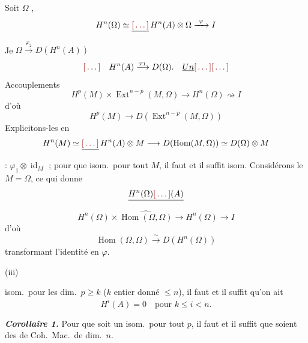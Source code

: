 \documentclass[11pt,a4paper]{article}
\begin{document}
Soit  $\Omega$ , 
\[
  H^n(\Omega) \simeq \struck{\ill{}}\, H^n(A) \otimes \Omega
  \xrightarrow{\ \varphi\ } I
\]
\struck{\ill{} \ill{}} Je  \ill{} \ill{} \ill{} \ill{}
$\Omega \xrightarrow{\varphi_2} D(H^n(A))$
\[
  \ill{}\quad H^n(A) \xrightarrow{\varphi_1} D(\Omega).
  \quad \uncertain{Un} \ill{} \ill{}
\]
Accouplements
\[
  H^p(M) \times \operatorname{Ext}^{n-p}(M, \Omega) \longrightarrow
  H^n(\Omega) \rightsquigarrow I
\]
d'où
\[
  H^p(M) \longrightarrow D(\operatorname{Ext}^{n-p}(M, \Omega))
\]
Explicitons-les en  
\[
  H^n(M) \simeq \struck{\ill{}}\, H^n(A) \otimes M \longrightarrow
  D(\operatorname{Hom}(M, \Omega)) \simeq D(\Omega) \otimes M
\]
\struck{\ill{} \ill{}}  : $\varphi_1 \otimes
\operatorname{id}_M$ ; pour que \ill{}
isom.\ pour tout $M$, il faut
et il suffit \ill{}  \ill{}
isom. Considérons le  $M = \Omega$,
ce qui donne
\[
  \struck{H^n(\Omega) \ill{}(A)}
\]
\[
  H^n(\Omega) \times \widehat{\operatorname{Hom}(\Omega, \Omega)}
  \longrightarrow H^n(\Omega) \longrightarrow I
\]
d'où
\[
  \operatorname{Hom}(\Omega, \Omega) \xrightarrow{\ \sim\ } D(H^n(\Omega))
\]
transformant l'identité en $\varphi$. 
 \struck{\ill{} \ill{} \ill{} \ill{} \ill{} :}


 \quad (iii)

isom.\ pour les dim.\ $p \geqslant k$
($k$ entier donné $\leqslant n$), il faut et il
suffit qu'on ait
\[
  H^i(A) = 0 \quad \text{pour } k \leqslant i < n.
\]

\textbf{\emph{Corollaire 1.}} Pour que \ill{} soit
un isom.\ pour \struck{\ill{}} tout
$p$, il faut et il suffit que 
 soient des
\struck{\ill{}}  de Coh.\ Mac.\ de dim.\ $n$.
\end{document}
